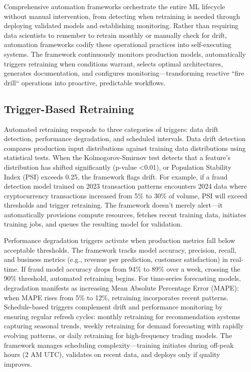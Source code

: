 Comprehensive automation frameworks orchestrate the entire ML lifecycle without manual intervention, from detecting when retraining is needed through deploying validated models and establishing monitoring. Rather than requiring data scientists to remember to retrain monthly or manually check for drift, automation frameworks codify these operational practices into self-executing systems. The framework continuously monitors production models, automatically triggers retraining when conditions warrant, selects optimal architectures, generates documentation, and configures monitoring---transforming reactive ``fire drill`` operations into proactive, predictable workflows.

\subsection{Trigger-Based Retraining}

Automated retraining responds to three categories of triggers: data drift detection, performance degradation, and scheduled intervals. Data drift detection compares production input distributions against training data distributions using statistical tests. When the Kolmogorov-Smirnov test detects that a feature's distribution has shifted significantly (p-value <0.01), or Population Stability Index (PSI) exceeds 0.25, the framework flags drift. For example, if a fraud detection model trained on 2023 transaction patterns encounters 2024 data where cryptocurrency transactions increased from 5\% to 30\% of volume, PSI will exceed thresholds and trigger retraining. The framework doesn't merely alert---it automatically provisions compute resources, fetches recent training data, initiates training jobs, and queues the resulting model for validation.

Performance degradation triggers activate when production metrics fall below acceptable thresholds. The framework tracks model accuracy, precision, recall, and business metrics (e.g., revenue per prediction, customer satisfaction) in real-time. If fraud model accuracy drops from 94\% to 89\% over a week, crossing the 90\% threshold, automated retraining begins. For time-series forecasting models, degradation manifests as increasing Mean Absolute Percentage Error (MAPE): when MAPE rises from 5\% to 12\%, retraining incorporates recent patterns. Schedule-based triggers complement drift and performance monitoring by ensuring regular refresh cycles: monthly retraining for recommendation systems capturing seasonal trends, weekly retraining for demand forecasting with rapidly evolving patterns, or daily retraining for high-frequency trading models. The framework manages scheduling complexity---training initiates during off-peak hours (2 AM UTC), validates on recent data, and deploys only if quality improves.

